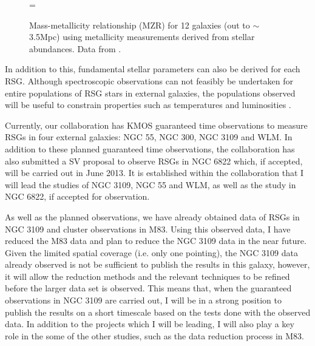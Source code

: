 \documentclass[a4paper,12pt]{article}
\begin{document}
\begin{figure}[t]     %
        \begin{center}
          \epsfxsize=\linewidth         %
\end{center}
\caption{Mass-metallicity relationship (MZR) for 12 galaxies (out to $\sim$3.5Mpc) using metallicity measurements derived from stellar abundances. Data from \cite{Kudritzki12}.}
\label{MZR}                 %
\end{figure}


In addition to this, fundamental stellar parameters can also be derived for each RSG. 
Although spectroscopic observations can not feasibly be undertaken for entire populations of RSG stars in external galaxies, the populations observed will be useful to constrain properties such as temperatures and luminosities .



Currently, our collaboration has KMOS guaranteed time observations to measure RSGs in four external galaxies: NGC 55, NGC 300, NGC 3109 and WLM.  
In addition to these planned guaranteed time observations, the collaboration has also submitted a SV proposal to observe RSGs in NGC 6822 which, if accepted, will be carried out in June 2013.
It is established within the collaboration that I will lead the studies of NGC 3109, NGC 55 and WLM, as well as the study in NGC 6822, if accepted for observation. 
  
As well as the planned observations, we have already obtained data of RSGs in NGC 3109 and cluster observations in M83. 
Using this observed data, I have reduced the M83 data and plan to reduce the NGC 3109 data in the near future.
Given the limited spatial coverage (i.e. only one pointing), the NGC 3109 data already observed is not be sufficient to publish the results in this galaxy, however, it will allow the reduction methods and the relevant techniques to be refined before the larger data set is observed.
This means that, when the guaranteed observations in NGC 3109 are carried out, I will be in a strong position to publish the results on a short timescale based on the tests done with the observed data. 
In addition to the projects which I will be leading, I will also play a key role in the some of the other studies, such as the data reduction process in M83. 
\end{document}
